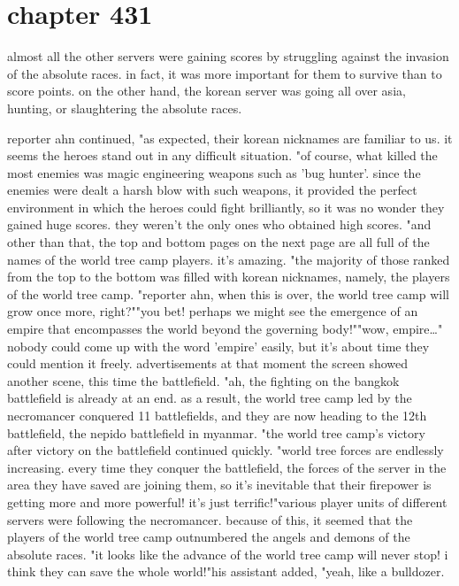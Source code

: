 \section{chapter 431}

almost all the other servers were gaining scores by struggling against the invasion of the absolute races.
 in fact, it was more important for them to survive than to score points.
 on the other hand, the korean server was going all over asia, hunting, or slaughtering the absolute races.





reporter ahn continued, "as expected, their korean nicknames are familiar to us.
 it seems the heroes stand out in any difficult situation.
"of course, what killed the most enemies was magic engineering weapons such as 'bug hunter'.
 since the enemies were dealt a harsh blow with such weapons, it provided the perfect environment in which the heroes could fight brilliantly, so it was no wonder they gained huge scores.
 they weren't the only ones who obtained high scores.
"and other than that, the top and bottom pages on the next page are all full of the names of the world tree camp players.
 it's amazing.
"the majority of those ranked from the top to the bottom was filled with korean nicknames, namely, the players of the world tree camp.
"reporter ahn, when this is over, the world tree camp will grow once more, right?""you bet! perhaps we might see the emergence of an empire that encompasses the world beyond the governing body!""wow, empire…"
nobody could come up with the word 'empire' easily, but it's about time they could mention it freely.
advertisements    at that moment the screen showed another scene, this time the battlefield.
"ah, the fighting on the bangkok battlefield is already at an end.
 as a result, the world tree camp led by the necromancer conquered 11 battlefields, and they are now heading to the 12th battlefield, the nepido battlefield in myanmar.
"the world tree camp's victory after victory on the battlefield continued quickly.
"world tree forces are endlessly increasing.
 every time they conquer the battlefield, the forces of the server in the area they have saved are joining them, so it's inevitable that their firepower is getting more and more powerful! it's just terrific!"various player units of different servers were following the necromancer.
 because of this, it seemed that the players of the world tree camp outnumbered the angels and demons of the absolute races.
 "it looks like the advance of the world tree camp will never stop! i think they can save the whole world!"his assistant added, "yeah, like a bulldozer.
